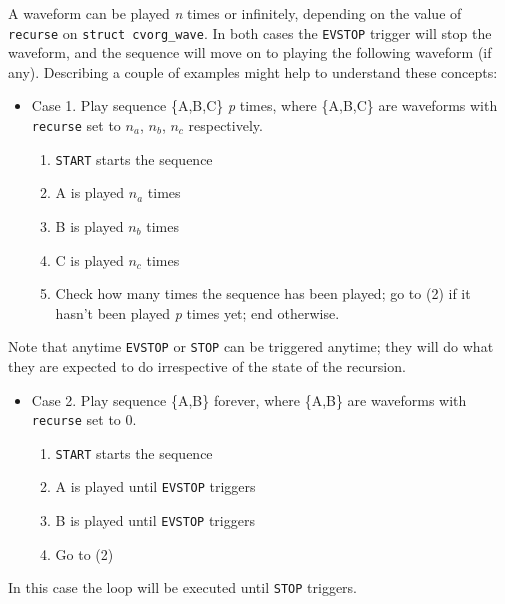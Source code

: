 \documentclass[12pt,a4paper]{article}
\begin{document}
    A waveform can be played \emph{n} times or infinitely, depending on the value
    of \verb~recurse~ on \verb~struct cvorg_wave~. In both cases the \verb~EVSTOP~ trigger
    will stop the waveform, and the sequence will move on to playing the
    following waveform (if any).
    Describing a couple of examples might help to understand these concepts:
\begin{itemize}
\item Case 1. Play sequence \{A,B,C\} \emph{p} times, where \{A,B,C\} are waveforms
      with \verb~recurse~ set to $n_a$, $n_b$, $n_c$ respectively.

\begin{enumerate}
\item \verb~START~ starts the sequence
\item A is played $n_a$ times
\item B is played $n_b$ times
\item C is played $n_c$ times
\item Check how many times the sequence has been played; go to (2)
        if it hasn't been played \emph{p} times yet; end otherwise.
\end{enumerate}

\end{itemize}
    Note that anytime \verb~EVSTOP~ or \verb~STOP~ can be triggered anytime; they will
    do what they are expected to do irrespective of the state of the recursion.
\begin{itemize}
\item Case 2. Play sequence \{A,B\} forever, where \{A,B\} are waveforms with
      \verb~recurse~ set to 0.

\begin{enumerate}
\item \verb~START~ starts the sequence
\item A is played until \verb~EVSTOP~ triggers
\item B is played until \verb~EVSTOP~ triggers
\item Go to (2)
\end{enumerate}

\end{itemize}
    In this case the loop will be executed until \verb~STOP~ triggers.
\end{document}
